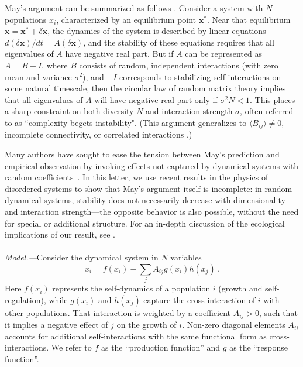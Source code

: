 \documentclass[
 prl,
 twocolumn,
 amsmath,
 amssymb,
 aps,
]{revtex4-2}
\begin{document}
May's argument can be summarized as follows \cite{May1972}.
Consider a system with $N$ populations $x_i$, characterized by an equilibrium point $\mathbf x^*$.
Near that equilibrium $\mathbf x = \mathbf x^* + \delta \mathbf x$, the dynamics of the system is described by linear equations $d(\delta \mathbf x)/dt = A (\delta \mathbf x)$, and the stability of these equations requires that all eigenvalues of $A$ have negative real part.
But if $A$ can be represented as $A = B - I$, where $B$ consists of random, independent interactions (with zero 
mean and variance $\sigma^2$), and $-I$ corresponds to stabilizing self-interactions on some natural timescale, 
then the circular law of random matrix theory implies that all eigenvalues of $A$ will have negative real part only if $\sigma^2 N < 1$.
This places a sharp constraint on both diversity $N$ and interaction strength $\sigma$, often referred to as ``complexity begets instability".
(This argument generalizes to $\langle B_{ij}\rangle \neq 0$, incomplete connectivity, or correlated interactions \cite{allesina2015stability}.)

Many authors have sought to ease the tension between May's prediction and empirical observation by invoking effects not captured by dynamical systems with random coefficients~\cite{McCann2000,Chesson2000,Mougi2012,Rohr2014,Barabas2017,Grilli2017}. 
In this letter, we use recent results in the physics of disordered systems \cite{Ahmadian2015, Roy2019} to show that May's argument itself is incomplete: in random dynamical systems, stability does not necessarily decrease with dimensionality and interaction strength---the opposite behavior is also possible, without the need for special or additional structure.
For an in-depth discussion of the ecological implications of our result, see \cite{Hatton2024}.

\paragraph*{}
\emph{Model.---}Consider the dynamical system in $N$ variables
\begin{equation}\label{dynamics}
    \dot{x}_i = f(x_i) - \sum_{j}A_{ij}g(x_i)h(x_j) \, .
\end{equation}
Here $f(x_i)$ represents the self-dynamics of a population $i$ (growth and self-regulation), while $g(x_i)$ and $h(x_j)$ capture the cross-interaction of $i$ with other populations. That interaction is weighted by a coefficient $A_{ij}>0$, such that it implies a negative effect of $j$ on the growth of $i$. Non-zero diagonal elements $A_{ii}$ accounts for additional self-interactions with the same functional form as cross-interactions. 
We refer to $f$ as the ``production function'' and $g$ as the ``response function''.
\end{document}
